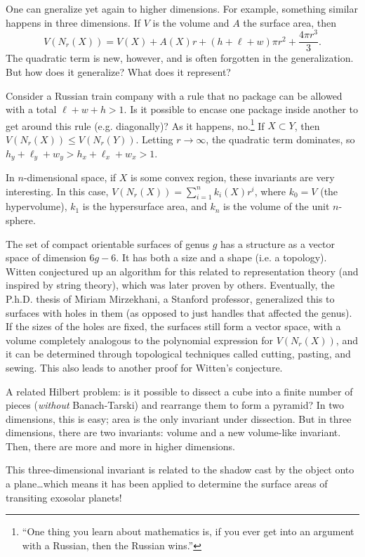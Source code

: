 One can gneralize yet again to higher dimensions. For example, something similar happens in three dimensions. If $V$ is the volume and $A$ the surface area, then
\[V(N_r(X)) = V(X) + A(X)r +(h+\ell+w)\pi r^2 +\frac{4\pi r^3}{3}.\]
The quadratic term is new, however, and is often forgotten in the generalization. But how does it generalize? What does it represent?

Consider a Russian train company with a rule that no package can be allowed with a total $\ell+w+h > 1$. Is it possible to encase one package inside another to get around this rule (e.g. diagonally)? As it happens, no.\footnote{``One thing you learn about mathematics is, if you ever get into an argument with a Russian, then the Russian wins.''} If $X\subset Y$, then $V(N_r(X)) \le V(N_r(Y))$. Letting $r\to\infty$, the quadratic term dominates, so $h_y+\ell_y+w_y > h_x+\ell_x+w_x > 1$.

In $n$-dimensional space, if $X$ is some convex region, these invariants are very interesting. In this case, $V(N_r(X)) = \sum_{i=1}^n k_i(X)r^i$, where $k_0 = V$ (the hypervolume), $k_1$ is the hypersurface area, and $k_n$ is the volume of the unit $n$-sphere.

The set of compact orientable surfaces of genus $g$ has a structure as a vector space of dimension $6g-6$. It has both a size and a shape (i.e. a topology). Witten conjectured up an algorithm for this related to representation theory (and inspired by string theory), which was later proven by others. Eventually, the P.h.D. thesis of Miriam Mirzekhani, a Stanford professor, generalized this to surfaces with holes in them (as opposed to just handles that affected the genus). If the sizes of the holes are fixed, the surfaces still form a vector space, with a volume completely analogous to the polynomial expression for $V(N_r(X))$, and it can be determined through topological techniques called cutting, pasting, and sewing. This also leads to another proof for Witten's conjecture.

A related Hilbert problem: is it possible to dissect a cube into a finite number of pieces (\emph{without} Banach-Tarski) and rearrange them to form a pyramid? In two dimensions, this is easy; area is the only invariant under dissection. But in three dimensions, there are two invariants: volume and a new volume-like invariant. Then, there are more and more in higher dimensions.

This three-dimensional invariant is related to the shadow cast by the object onto a plane\dots which means it has been applied to determine the surface areas of transiting exosolar planets!
